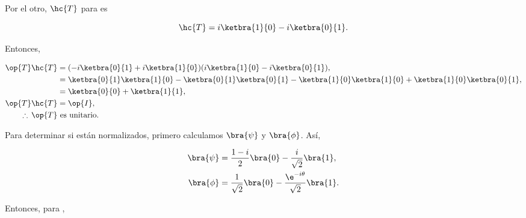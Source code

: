 \documentclass[./../main.tex]{subfiles}
\begin{document}
\begin{problema}
\begin{enumerate}
		      Por el otro, \(\hc{T}\) para  es

		      \begin{equation*}
			      \hc{T} = i\ketbra{1}{0} - i\ketbra{0}{1}.
		      \end{equation*}

		      Entonces,

		      \begin{align*}
			      \op{T}\hc{T}        & = (-i\ketbra{0}{1} + i\ketbra{1}{0})(i\ketbra{1}{0} - i\ketbra{0}{1}),                                               \\
			                          & = \ketbra{0}{1}\ketbra{1}{0} - \ketbra{0}{1}\ketbra{0}{1} - \ketbra{1}{0}\ketbra{1}{0} + \ketbra{1}{0}\ketbra{0}{1}, \\
			                          & = \ketbra{0}{0} + \ketbra{1}{1},                                                                                     \\
			      \op{T}\hc{T}        & = \op{I},                                                                                                            \\
			      \therefore\, \op{T} & \text{ es unitario}.
		      \end{align*}

		      Para determinar si  están normalizados, primero calculamos \(\bra{\psi}\) y \(\bra{\phi}\). Así,

		      \begin{align*}
			      \bra{\psi} & = \dfrac{1 - i}{2}\bra{0} - \dfrac{i}{\sqrt{2}}\bra{1},                \\
			      \bra{\phi} & = \dfrac{1}{\sqrt{2}}\bra{0} - \dfrac{\e^{-i\theta}}{\sqrt{2}}\bra{1}.
		      \end{align*}

		      Entonces, para ,


\end{enumerate}
\end{problema}
\end{document}
